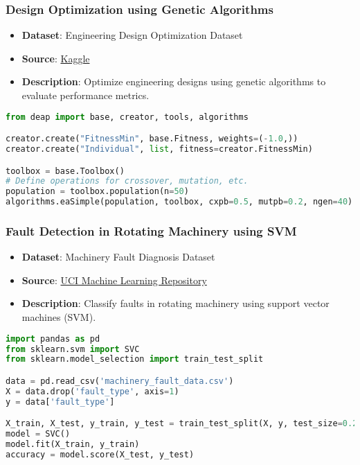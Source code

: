 \begin{frame}[fragile]\frametitle{Design Optimization using Genetic Algorithms}
    \begin{itemize}
        \item \textbf{Dataset}: Engineering Design Optimization Dataset
        \item \textbf{Source}: \href{https://www.kaggle.com/datasets/sagnik1511/design-optimization-dataset}{Kaggle}
        \item \textbf{Description}: Optimize engineering designs using genetic algorithms to evaluate performance metrics.
    \end{itemize}
    \begin{lstlisting}[language=Python]
from deap import base, creator, tools, algorithms

creator.create("FitnessMin", base.Fitness, weights=(-1.0,))
creator.create("Individual", list, fitness=creator.FitnessMin)

toolbox = base.Toolbox()
# Define operations for crossover, mutation, etc.
population = toolbox.population(n=50)
algorithms.eaSimple(population, toolbox, cxpb=0.5, mutpb=0.2, ngen=40)
    \end{lstlisting}
\end{frame}

\begin{frame}[fragile]\frametitle{Fault Detection in Rotating Machinery using SVM}
    \begin{itemize}
        \item \textbf{Dataset}: Machinery Fault Diagnosis Dataset
        \item \textbf{Source}: \href{https://archive.ics.uci.edu/ml/datasets/Machinery+Fault+Diagnosis}{UCI Machine Learning Repository}
        \item \textbf{Description}: Classify faults in rotating machinery using support vector machines (SVM).
    \end{itemize}
    \begin{lstlisting}[language=Python]
import pandas as pd
from sklearn.svm import SVC
from sklearn.model_selection import train_test_split

data = pd.read_csv('machinery_fault_data.csv')
X = data.drop('fault_type', axis=1)
y = data['fault_type']

X_train, X_test, y_train, y_test = train_test_split(X, y, test_size=0.25)
model = SVC()
model.fit(X_train, y_train)
accuracy = model.score(X_test, y_test)
    \end{lstlisting}
\end{frame}

